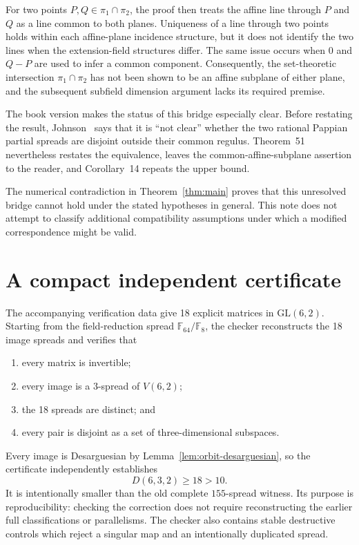 \documentclass[11pt]{article}
\newcommand{\F}{\mathbb F}
\begin{document}
For two points $P,Q\in\pi_1\cap\pi_2$, the proof then treats the affine line
through $P$ and $Q$ as a line common to both planes. Uniqueness of a line
through two points holds within each affine-plane incidence structure, but it
does not identify the two lines when the extension-field structures differ.
The same issue occurs when $0$ and $Q-P$ are used to infer a common component.
Consequently, the set-theoretic intersection $\pi_1\cap\pi_2$ has not been
shown to be an affine subplane of either plane, and the subsequent subfield
dimension argument lacks its required premise.

The book version makes the status of this bridge especially clear. Before
restating the result, Johnson~\cite[pp.~134--136]{JohnsonBook} says that it is
``not clear'' whether the two rational Pappian partial spreads are disjoint
outside their common regulus. Theorem~51 nevertheless restates the
equivalence, leaves the common-affine-subplane assertion to the reader, and
Corollary~14 repeats the upper bound.

The numerical contradiction in Theorem~\ref{thm:main} proves that this
unresolved bridge cannot hold under the stated hypotheses in general. This
note does not attempt to classify additional compatibility assumptions under
which a modified correspondence might be valid.

\section{A compact independent certificate}\label{sec:certificate}

The accompanying verification data give 18 explicit matrices in
$\mathrm{GL}(6,2)$. Starting from the field-reduction spread
$\F_{64}/\F_8$, the checker reconstructs the 18 image spreads and verifies
that
\begin{enumerate}
\item every matrix is invertible;
\item every image is a $3$-spread of $V(6,2)$;
\item the 18 spreads are distinct; and
\item every pair is disjoint as a set of three-dimensional subspaces.
\end{enumerate}

Every image is Desarguesian by Lemma~\ref{lem:orbit-desarguesian}, so the
certificate independently establishes
\[
D(6,3,2)\geq18>10.
\]
It is intentionally smaller than the old complete $155$-spread witness. Its
purpose is reproducibility: checking the correction does not require
reconstructing the earlier full classifications or parallelisms. The checker
also contains stable destructive controls which reject a singular map and an
intentionally duplicated spread.
\end{document}
